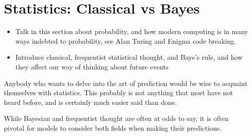 \documentclass[../../fulltext/fulltext.tex]{subfiles}
\begin{document}
\chapter{Statistics: Classical vs Bayes}

\begin{itemize}
	\item Talk in this section about probability, and how modern computing is in many ways indebted to probability, see Alan Turing and Enigma code breaking.  
	\item Introduce classical, frequentist statistical thought, and Baye's rule, and how they affect our way of thinking about future events
\end{itemize}
Anybody who wants to delve into the art of prediction would be wise to acquaint themselves with statistics.  This probably is not anything that most have not heard before, and is certainly much easier said than done.  

While Bayesian and frequentist thought are often at odds to say, it is often pivotal for models to consider both fields when making their predictions.
\end{document}
